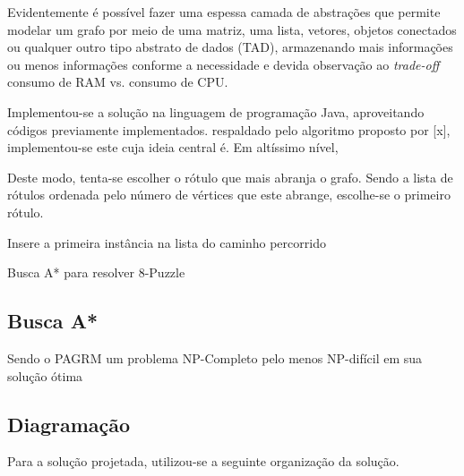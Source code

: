 \documentclass[12pt]{article}
\begin{document}
	Evidentemente é possível fazer uma espessa camada de abstrações que permite modelar um grafo por meio de uma matriz, uma lista, vetores, objetos conectados ou qualquer outro tipo abstrato de dados (TAD), armazenando mais informações ou menos informações conforme a necessidade e devida observação ao \textit{trade-off} consumo de RAM vs. consumo de CPU.

	Implementou-se a solução na linguagem de programação Java, aproveitando códigos previamente implementados.
	respaldado pelo algoritmo proposto por [x], implementou-se este cuja ideia central é.
	Em altíssimo nível,

	Deste modo, tenta-se escolher o rótulo que mais abranja o grafo. Sendo a lista de rótulos ordenada pelo número de vértices que este abrange, escolhe-se o primeiro rótulo.

	\begin{algorithm}[H]
		Insere a primeira instância na lista do caminho percorrido\;
		\caption{Busca A* para resolver 8-Puzzle}
	\end{algorithm}

	\subsection{Busca A*}\label{sec:aestrela}

		Sendo o PAGRM um problema NP-Completo pelo menos NP-difícil em sua solução ótima 

	\subsection{Diagramação}\label{sec:diagramacao}

		Para a solução projetada, utilizou-se a seguinte organização da solução.
\end{document}
